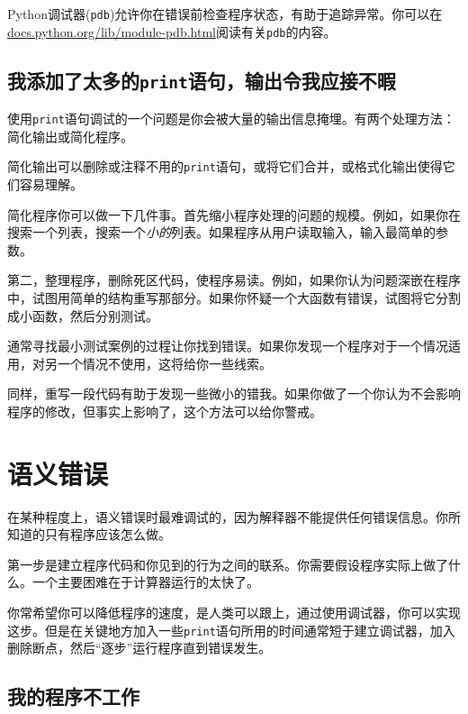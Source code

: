 Python调试器({\tt pdb})允许你在错误前检查程序状态，有助于追踪异常。你可以在 \url{docs.python.org/lib/module-pdb.html}阅读有关{\tt pdb}的内容。


\subsection{我添加了太多的{\tt print}语句，输出令我应接不暇}


使用{\tt print}语句调试的一个问题是你会被大量的输出信息掩埋。有两个处理方法：简化输出或简化程序。

简化输出可以删除或注释不用的{\tt print}语句，或将它们合并，或格式化输出使得它们容易理解。

简化程序你可以做一下几件事。首先缩小程序处理的问题的规模。例如，如果你在搜索一个列表，搜索一个{\em 小的}列表。如果程序从用户读取输入，输入最简单的参数。


第二，整理程序，删除死区代码，使程序易读。例如，如果你认为问题深嵌在程序中，试图用简单的结构重写那部分。如果你怀疑一个大函数有错误，试图将它分割成小函数，然后分别测试。


通常寻找最小测试案例的过程让你找到错误。如果你发现一个程序对于一个情况适用，对另一个情况不使用，这将给你一些线索。

同样，重写一段代码有助于发现一些微小的错我。如果你做了一个你认为不会影响程序的修改，但事实上影响了，这个方法可以给你警戒。


\section{语义错误}

在某种程度上，语义错误时最难调试的，因为解释器不能提供任何错误信息。你所知道的只有程序应该怎么做。

第一步是建立程序代码和你见到的行为之间的联系。你需要假设程序实际上做了什么。一个主要困难在于计算器运行的太快了。

你常希望你可以降低程序的速度，是人类可以跟上，通过使用调试器，你可以实现这步。但是在关键地方加入一些{\tt print}语句所用的时间通常短于建立调试器，加入删除断点，然后“逐步”运行程序直到错误发生。

\subsection{我的程序不工作}

